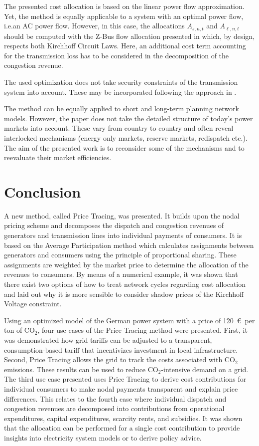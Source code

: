 \documentclass[11pt,twocolumn]{article}
\newcommand{\ie}{i.e.}
\newcommand{\allocategeneration}[1][s, n]{A_{#1,t}}
\newcommand{\allocateflow}[1][n]{A_{\ell,#1,t}}
\begin{document}
The presented cost allocation is based on the linear power flow approximation. Yet, the method is equally applicable to a system with an optimal power flow, \ie an \ac{AC} power flow. However, in this case, the allocations $\allocategeneration$ and $\allocateflow$ should be computed with the Z-Bus flow allocation presented in \cite{conejo_z-bus_2007} which, by design, respects both Kirchhoff Circuit Laws. Here, an additional cost term accounting for the transmission loss has to be considered in the decomposition of the congestion revenue. 

The used optimization does not take security constraints of the transmission system into account. These may be incorporated following the approach in \cite{nikoukar_transmission_2012}. 

The method can be equally applied to short and long-term planning network models. However, the paper does not take the detailed structure of today's power markets into account. These vary from country to country and often reveal interlocked mechanisms (energy only markets, reserve markets, redispatch etc.). The aim of the presented work is to reconsider some of the mechanisms and  to reevaluate their market efficiencies.    


\section{Conclusion}
\label{sec:conclusions}

A new method, called Price Tracing, was presented. It builds upon the nodal pricing scheme and decomposes the dispatch and congestion revenues of generators and transmission lines into individual payments of consumers. It is based on the Average Participation method which calculates assignments between generators and consumers using the principle of proportional sharing. These assignments are weighted by the market price to determine the allocation of the revenues to consumers. By means of a numerical example, it was shown that there exist two options of how to treat network cycles regarding cost allocation and laid out why it is more sensible to consider shadow prices of the Kirchhoff Voltage constraint.     

Using an optimized model of the German power system with a price of 120~\euro\, per ton of CO$_2$, four use cases of the Price Tracing method were presented. First, it was demonstrated how grid tariffs can be adjusted to a transparent, consumption-based tariff that incentivizes investment in local infrastructure. Second, Price Tracing allows the grid to track the costs associated with CO$_2$ emissions. These results can be used to reduce CO$_2$-intensive demand on a grid. The third use case presented uses Price Tracing to derive cost contributions for individual consumers to make nodal payments transparent and explain price differences. This relates to the fourth case where individual dispatch and congestion revenues are decomposed into contributions from operational expenditures, capital expenditures, scarcity rents, and subsidies. It was shown that the allocation can be performed for a single cost contribution to provide insights into electricity system models or to derive policy advice.       
\end{document}
